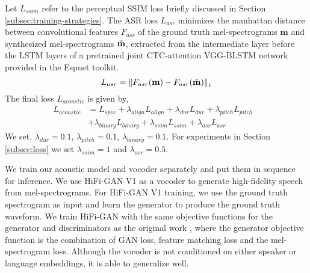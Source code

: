 \documentclass{article}
\begin{document}
Let $L_{ssim}$ refer to the perceptual SSIM loss briefly discussed in Section \ref{subsec:training-strategies}. The ASR loss $L_{asr}$ minimizes the manhattan distance between convolutional features $F_{asr}$ of the ground truth mel-spectrograms $\mathbf{m}$ and synthesized mel-spectrograms $\Hat{\mathbf{m}}$,
extracted from the intermediate layer before the LSTM layers of a pretrained joint CTC-attention VGG-BLSTM network provided in the Espnet toolkit.
\[
L_{asr} = \left \lVert F_{asr}(\mathbf{m}) - F_{asr}(\Hat{\mathbf{m}}) \right \rVert_{1}
\]
The final loss $L_{acoustic}$ is given by,
\begin{align*}
    L_{acoustic} &=  L_{spec} + \lambda_{align}L_{align} + \lambda_{dur}L_{dur} + \lambda_{pitch}L_{pitch} &\\
    & + \lambda_{binary}L_{binary} + \lambda_{ssim}L_{ssim} + \lambda_{asr}L_{asr} &
\end{align*}
We set, $\lambda_{dur}=0.1$, $\lambda_{pitch}=0.1$, $\lambda_{binary}=0.1$. For experiments in Section \ref{subsec:loss} we set $\lambda_{ssim}=1$ and $\lambda_{asr}=0.5$.

We train our acoustic model and vocoder separately and put them in sequence for inference. We use HiFi-GAN V1 \cite{kong2020hifi} as a vocoder to generate high-fidelity speech from mel-spectrograms. For HiFi-GAN V1 training, we use the ground truth spectrogram as input and learn the generator to produce the ground truth waveform. We train HiFi-GAN with the same objective functions for the generator and discriminators as the original work \cite{kong2020hifi}, where the generator objective function is the combination of GAN loss, feature matching loss and the mel-spectrogram loss. Although the vocoder is not conditioned on either speaker or language embeddings, it is able to generalize well. 
\end{document}
